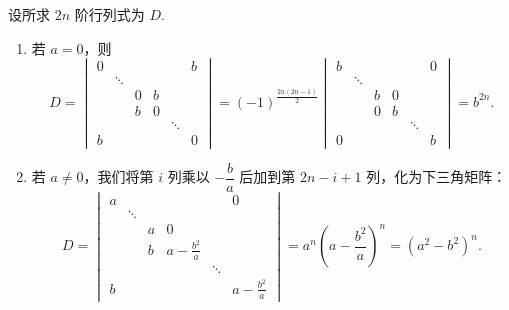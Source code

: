 \documentclass[12pt,fontset=fandol]{ctexart}
\begin{document}
\begin{solve}
设所求 $2n$ 阶行列式为 $D$.
            \begin{enumerate}
                \item 若 $a=0$，则
                    \[
                        D = \begin{vmatrix}
                            0 &         &   &   &         & b \\
                              & \ddots  &   &   &         &   \\
                              &         & 0 & b &         &   \\
                              &         & b & 0 &         &   \\
                              &         &   &   & \ddots  &   \\
                            b &         &   &   &         & 0
                        \end{vmatrix}
                        = (-1)^{\frac{2n(2n-1)}{2}} \begin{vmatrix}
                            b &         &   &   &         & 0 \\
                              & \ddots  &   &   &         &   \\
                              &         & b & 0 &         &   \\
                              &         & 0 & b &         &   \\
                              &         &   &   & \ddots  &   \\
                            0 &         &   &   &         & b
                        \end{vmatrix}
                        = b^{2n}.
                    \]
                \item 若 $a \neq 0$，我们将第 $i$ 列乘以 $-\dfrac{b}{a}$ 后加到第 $2n-i+1$ 列，化为下三角矩阵：
                    \[
                        D = \begin{vmatrix}
                            a &         &   &                   &         & 0                 \\
                              & \ddots  &   &                   &         &                   \\
                              &         & a & 0                 &         &                   \\
                              &         & b & a - \frac{b^2}{a} &         &                   \\
                              &         &   &                   & \ddots  &                   \\
                            b &         &   &                   &         & a - \frac{b^2}{a}
                        \end{vmatrix}
                        = a^n (a - \frac{b^2}{a})^n
                        = (a^2 - b^2)^n.
                    \]
            \end{enumerate}
\end{solve}
\end{document}
